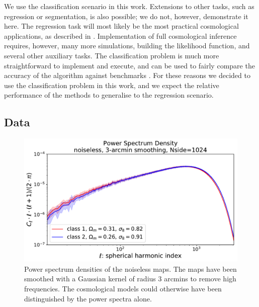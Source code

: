 \documentclass[final,twocolumn,3p,times,authoryear]{elsarticle}
\newcommand{\1}{\b{1}}              %
\newcommand{\0}{\b{0}}              %
\begin{document}
We use the classification scenario in this work.
Extensions to other tasks, such as regression or segmentation, is also possible; we do not, however, demonstrate it here.
The regression task will most likely be the most practical cosmological applications, as described in \citep{gupta2018nongaussianinformation,fluri2018deep}.
Implementation of full cosmological inference requires, however, many more simulations, building the likelihood function, and several other auxiliary tasks.
The classification problem is much more straightforward to implement and execute, and can be used to fairly compare the accuracy of the algorithm against benchmarks \citep{schmelze2017cosmologicalmodel}.
For these reasons we decided to use the classification problem in this work, and we expect the relative performance of the methods to generalise to the regression scenario.


\subsection{Data}
\label{sec:data}

\begin{figure}
\centering
\includegraphics[width=\linewidth]{psd_sigma3}
\caption{Power spectrum densities of the noiseless maps.
The maps have been smoothed with a Gaussian kernel of radius $3$ arcmins to remove high frequencies.
The cosmological models could otherwise have been distinguished by the power spectra alone.}
\label{fig:psd_sigma3}
\end{figure}
\end{document}
